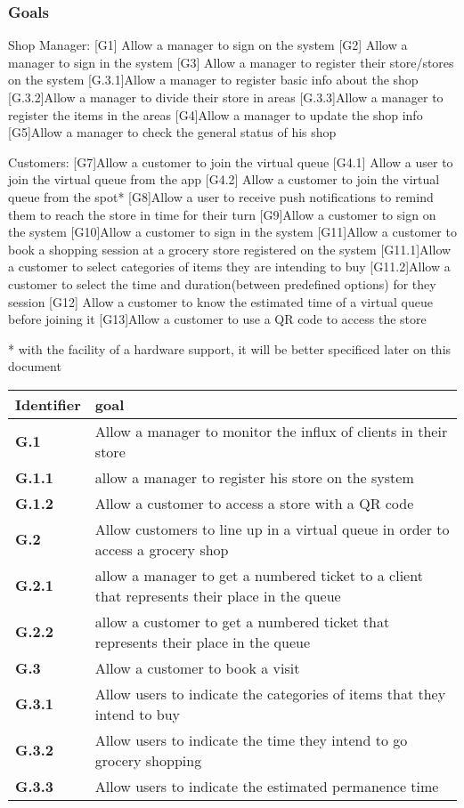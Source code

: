 \subsubsection{Goals}
\label{subsect:goals}

Shop Manager:
[G1] Allow a manager to sign on the system
[G2] Allow a manager to sign in the system
[G3] Allow a manager to register their store/stores on the system
    [G.3.1]Allow a manager to register basic info about the shop
	[G.3.2]Allow a manager to divide their store in areas 
	[G.3.3]Allow a manager to register the items in the areas 
[G4]Allow a manager to update the shop info
[G5]Allow a manager to check the general status of his shop

Customers:
[G7]Allow a customer to join the virtual queue 
    [G4.1] Allow a user to join the virtual queue from the app
    [G4.2] Allow a customer to join the virtual queue from the spot*
[G8]Allow a user to receive push notifications to remind them to reach the store in time for their turn
[G9]Allow a customer to sign on the system
[G10]Allow a customer to sign in the system
[G11]Allow a customer to book a shopping session at a grocery store registered on the system
	[G11.1]Allow a customer to select categories of items they are 		intending to 
	buy
	[G11.2]Allow a customer to select the time and duration(between 		predefined options) for they session 	
[G12] Allow a customer to know the estimated time of a virtual queue before		joining it
[G13]Allow a customer to use a QR code to access the store 


* with the facility of a hardware support, it will be better specificed later on this document

\begin{tabular}{|l|l|}
    \hline
    \textbf{Identifier} & \textbf{goal}\\
    \hline
    \textbf{G.1} & Allow a manager to monitor the influx of clients in their store\\
    \textbf{G.1.1} & allow a manager to register his store on the system\\
    \textbf{G.1.2} & Allow a customer to access a store with a QR code\\
    \hline
    \textbf{G.2} & Allow customers to line up in a virtual queue in order to access a grocery shop\\
    \textbf{G.2.1} & allow a manager to get a numbered ticket to a client that represents their place in the queue\\
    \textbf{G.2.2} & allow a customer to get a numbered ticket that represents their place in the queue\\
    \hline
    \textbf{G.3} & Allow a customer to book a visit\\
    \textbf{G.3.1} & Allow users to indicate the categories of items that they intend to buy\\
    \textbf{G.3.2} & Allow users to indicate the time they intend to go grocery shopping\\
    \textbf{G.3.3} & Allow users to indicate the estimated permanence time \\
    \hline
\end{tabular}

